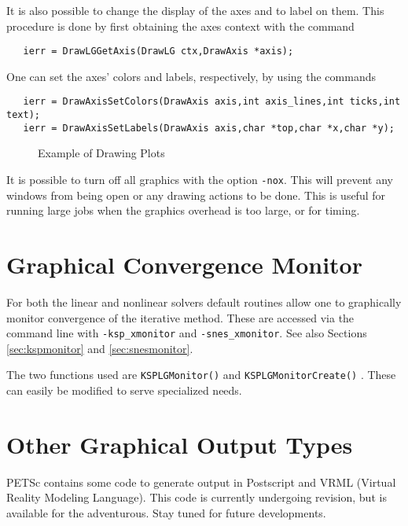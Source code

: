 It is also possible to change the display of the axes and to label
on them. This procedure is done by first obtaining the axes context with the 
command  
\begin{verbatim}
   ierr = DrawLGGetAxis(DrawLG ctx,DrawAxis *axis);
\end{verbatim}
One can set the axes' colors and labels, respectively, by using the
commands  
\begin{verbatim}
   ierr = DrawAxisSetColors(DrawAxis axis,int axis_lines,int ticks,int text);
   ierr = DrawAxisSetLabels(DrawAxis axis,char *top,char *x,char *y);
\end{verbatim}

\begin{figure}[H]
{\small
{}
}
\caption{Example of Drawing Plots}
\label{fig:plot}
\end{figure}

It is possible to turn off all graphics with the option 
{\tt -nox}. This
will prevent any windows from being open or any drawing actions to be done.
This is useful for running large jobs when the graphics overhead is too
large, or for timing.

\section{Graphical Convergence Monitor}
For both the linear and nonlinear solvers default routines
allow one to graphically monitor convergence of the iterative method.
These are accessed via the command line with 
{\tt -ksp\_xmonitor} and {\tt -snes\_xmonitor}. 
 See also Sections \ref{sec:kspmonitor} and
\ref{sec:snesmonitor}. 

The two functions used are {\tt KSPLGMonitor()} 
and {\tt KSPLGMonitorCreate()}  . These 
can easily be modified to serve specialized needs.

\section{Other Graphical Output Types}
PETSc contains some code to generate output in Postscript and VRML (Virtual
Reality Modeling Language).  This code is currently undergoing revision, but
is available for the adventurous.  Stay tuned for future developments.

